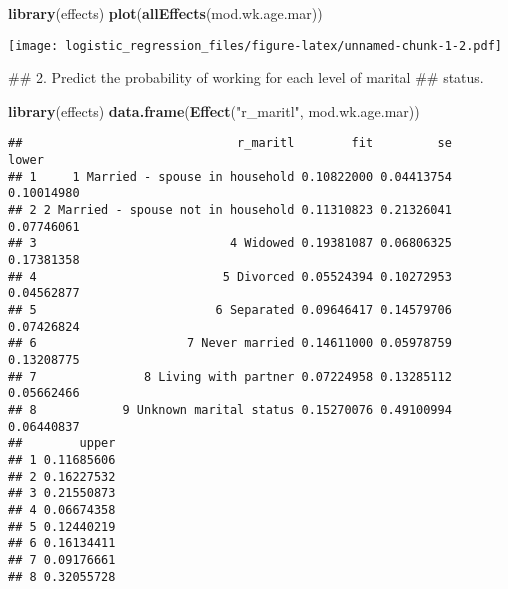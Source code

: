 \documentclass[]{article}
\newenvironment{Shaded}{\begin{snugshade}}{\end{snugshade}}
\newcommand{\KeywordTok}[1]{\textcolor[rgb]{0.13,0.29,0.53}{\textbf{#1}}}
\newcommand{\StringTok}[1]{\textcolor[rgb]{0.31,0.60,0.02}{#1}}
\newcommand{\NormalTok}[1]{#1}
\begin{document}
\begin{Shaded}
\begin{Highlighting}[]
\KeywordTok{library}\NormalTok{(effects)}
\KeywordTok{plot}\NormalTok{(}\KeywordTok{allEffects}\NormalTok{(mod.wk.age.mar))}
\end{Highlighting}
\end{Shaded}

\texttt{[image: logistic\_regression\_files/figure-latex/unnamed-chunk-1-2.pdf]}

\begin{Shaded}
\begin{Highlighting}[]
\NormalTok{##   2. Predict the probability of working for each level of marital}
\NormalTok{##      status.}

\KeywordTok{library}\NormalTok{(effects)}
\KeywordTok{data.frame}\NormalTok{(}\KeywordTok{Effect}\NormalTok{(}\StringTok{"r_maritl"}\NormalTok{, mod.wk.age.mar))}
\end{Highlighting}
\end{Shaded}

\begin{verbatim}
##                              r_maritl        fit         se      lower
## 1     1 Married - spouse in household 0.10822000 0.04413754 0.10014980
## 2 2 Married - spouse not in household 0.11310823 0.21326041 0.07746061
## 3                           4 Widowed 0.19381087 0.06806325 0.17381358
## 4                          5 Divorced 0.05524394 0.10272953 0.04562877
## 5                         6 Separated 0.09646417 0.14579706 0.07426824
## 6                     7 Never married 0.14611000 0.05978759 0.13208775
## 7               8 Living with partner 0.07224958 0.13285112 0.05662466
## 8            9 Unknown marital status 0.15270076 0.49100994 0.06440837
##        upper
## 1 0.11685606
## 2 0.16227532
## 3 0.21550873
## 4 0.06674358
## 5 0.12440219
## 6 0.16134411
## 7 0.09176661
## 8 0.32055728
\end{verbatim}
\end{document}
